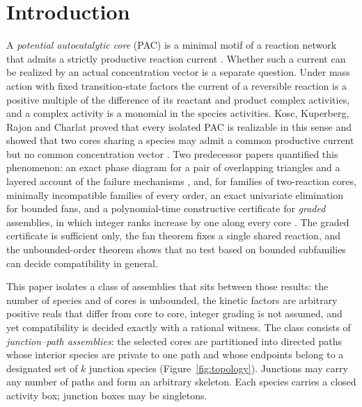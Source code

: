 \documentclass[11pt,a4paper]{article}
\theoremstyle{plain}
\theoremstyle{definition}
\theoremstyle{remark}
\begin{document}
\section{Introduction}\label{sec:intro}

A \emph{potential autocatalytic core} (PAC) is a minimal motif of a reaction network that admits a strictly productive reaction current \citep{blokhuis2020,kosc2025}. Whether such a current can be realized by an actual concentration vector is a separate question. Under mass action with fixed transition-state factors the current of a reversible reaction is a positive multiple of the difference of its reactant and product complex activities, and a complex activity is a monomial in the species activities. Kosc, Kuperberg, Rajon and Charlat proved that every isolated PAC is realizable in this sense and showed that two cores sharing a species may admit a common productive current but no common concentration vector \citep{kosc2025}. Two predecessor papers quantified this phenomenon: an exact phase diagram for a pair of overlapping triangles and a layered account of the failure mechanisms \citep{tcic2026}, and, for families of two-reaction cores, minimally incompatible families of every order, an exact univariate elimination for bounded fans, and a polynomial-time constructive certificate for \emph{graded} assemblies, in which integer ranks increase by one along every core \citep{tcch2026}. The graded certificate is sufficient only, the fan theorem fixes a single shared reaction, and the unbounded-order theorem shows that no test based on bounded subfamilies can decide compatibility in general.

This paper isolates a class of assemblies that sits between those results: the number of species and of cores is unbounded, the kinetic factors are arbitrary positive reals that differ from core to core, integer grading is not assumed, and yet compatibility is decided exactly with a rational witness. The class consists of \emph{junction--path assemblies}: the selected cores are partitioned into directed paths whose interior species are private to one path and whose endpoints belong to a designated set of $k$ junction species (Figure~\ref{fig:topology}). Junctions may carry any number of paths and form an arbitrary skeleton. Each species carries a closed activity box; junction boxes may be singletons.
\end{document}
